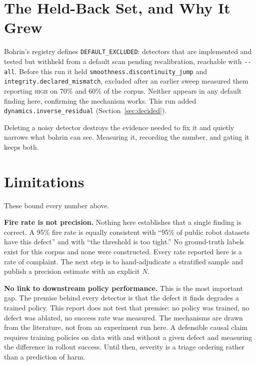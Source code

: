 \documentclass[10pt,a4paper]{article}
\newcommand{\dtr}[1]{\texttt{\small #1}}
\begin{document}
\section{The Held-Back Set, and Why It Grew}
\label{sec:excluded}

Bohrin's registry defines \texttt{DEFAULT\_EXCLUDED}: detectors that are implemented and
tested but withheld from a default scan pending recalibration, reachable with
\texttt{-{}-all}. Before this run it held \dtr{smoothness.discontinuity\_jump} and
\dtr{integrity.declared\_mismatch}, excluded after an earlier sweep measured them reporting
\textsc{high} on 70\% and 60\% of the corpus. Neither appears in any default finding here,
confirming the mechanism works. This run added \dtr{dynamics.inverse\_residual}
(Section~\ref{sec:decided}).

Deleting a noisy detector destroys the evidence needed to fix it and quietly narrows what
bohrin can see. Measuring it, recording the number, and gating it keeps both.

\section{Limitations}
\label{sec:limits}

These bound every number above.

\textbf{Fire rate is not precision.} Nothing here establishes that a single finding is
correct. A 95\% fire rate is equally consistent with ``95\% of public robot datasets have
this defect'' and with ``the threshold is too tight.'' No ground-truth labels exist for this
corpus and none were constructed. Every rate reported here is a rate of complaint. The next
step is to hand-adjudicate a stratified sample and publish a precision estimate with an
explicit $N$.

\textbf{No link to downstream policy performance.} This is the most important gap. The
premise behind every detector is that the defect it finds degrades a trained policy. This
report does not test that premise: no policy was trained, no defect was ablated, no success
rate was measured. The mechanisms are drawn from the literature, not from an experiment run
here. A defensible causal claim requires training policies on data with and without a given
defect and measuring the difference in rollout success. Until then, severity is a triage
ordering rather than a prediction of harm.
\end{document}
